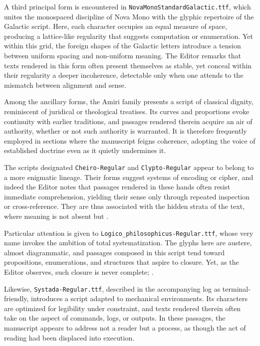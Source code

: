 {\medskip

A third principal form is encountered in \texttt{NovaMonoStandardGalactic.ttf},
which unites the monospaced discipline of Nova Mono with the glyphic repertoire
of the Galactic script. Here, each character occupies an equal measure of space,
producing a lattice-like regularity that suggests computation or enumeration.
Yet within this grid, the foreign shapes of the Galactic letters introduce a
tension between uniform spacing and non-uniform meaning. The Editor remarks that
texts rendered in this form often present themselves as stable, yet conceal
within their regularity a deeper incoherence, detectable only when one attends
to the mismatch between alignment and sense.

\medskip

Among the ancillary forms, the Amiri family presents a script of classical
dignity, reminiscent of juridical or theological treatises. Its curves and
proportions evoke continuity with earlier traditions, and passages rendered
therein acquire an air of authority, whether or not such authority is warranted.
It is therefore frequently employed in sections where the manuscript feigns
coherence, adopting the voice of established doctrine even as it quietly
undermines it.

\medskip

The scripts designated \texttt{Cheiro-Regular} and \texttt{Clypto-Regular}
appear to belong to a more enigmatic lineage. Their forms suggest systems of
encoding or cipher, and indeed the Editor notes that passages rendered in these
hands often resist immediate comprehension, yielding their sense only through
repeated inspection or cross-reference. They are thus associated with the hidden
strata of the text, where meaning is not absent but .

\medskip

Particular attention is given to \texttt{Logico\_philosophicus-Regular.ttf},
whose very name invokes the ambition of total systematization. The glyphs here
are austere, almost diagrammatic, and passages composed in this script tend
toward propositions, enumerations, and structures that aspire to closure. Yet,
as the Editor observes, such closure is never complete; .

\medskip

Likewise, \texttt{Systada-Regular.ttf}, described in the accompanying log as
terminal-friendly, introduces a script adapted to mechanical environments. Its
characters are optimized for legibility under constraint, and texts rendered
therein often take on the aspect of commands, logs, or outputs. In these
passages, the manuscript appears to address not a reader but a process, as
though the act of reading had been displaced into execution.

}
